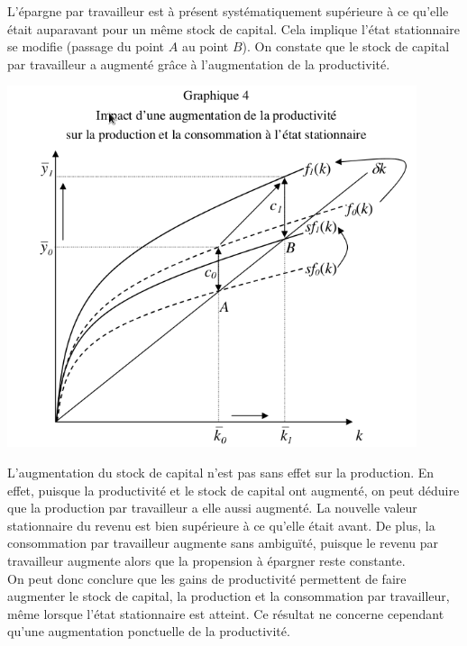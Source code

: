 \documentclass[10pt]{book}
\begin{document}
L'épargne par travailleur est à présent systématiquement supérieure à ce qu'elle était auparavant pour un même stock de capital. Cela implique l'état stationnaire se modifie (passage du point $A$ au point $B$). On constate que le stock de capital par travailleur a augmenté grâce à l'augmentation de la productivité.
\begin{center}
  \includegraphics[width=12cm]{graph8.png}
\end{center}
L'augmentation du stock de capital n'est pas sans effet sur la production. En effet, puisque la productivité et le stock de capital ont augmenté, on peut déduire que la production par travailleur a elle aussi augmenté. La nouvelle valeur stationnaire du revenu est bien supérieure à ce qu'elle était avant. De plus, la consommation par travailleur augmente sans ambiguïté, puisque le revenu par travailleur augmente alors que la propension à épargner reste constante. \\
On peut donc conclure que les gains de productivité permettent de faire augmenter le stock de capital, la production et la consommation par travailleur, même lorsque l'état stationnaire est atteint. Ce résultat ne concerne cependant qu'une augmentation ponctuelle de la productivité.
\end{document}
